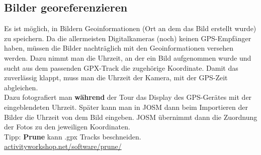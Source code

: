 \documentclass[a4paper,11pt,notumble]{leaflet}
\begin{document}
\subsection*{Bilder georeferenzieren} Es ist möglich, in Bildern Geoinformationen (Ort an dem das Bild erstellt wurde) zu 
speichern. Da die allermeisten Digitalkameras (noch) keinen GPS-Empfänger haben, müssen die Bilder nachträglich mit 
den Geoinformationen versehen werden. Dazu nimmt man die Uhrzeit, an der ein Bild aufgenommen wurde und sucht aus dem 
passenden GPX-Track die zugehörige Koordinate. Damit das zuverlässig klappt, muss man die Uhrzeit der Kamera, mit der 
GPS-Zeit abgleichen. \\
Dazu fotografiert man \textbf{während} der Tour das Display des GPS-Gerätes mit der eingeblendeten Uhrzeit. Später 
kann man in JOSM dann beim Importieren der Bilder die Uhrzeit von dem Bild eingeben. JOSM übernimmt dann die Zuordnung
der Fotos zu den jeweiligen Koordinaten. \\

Tipp: \textbf{Prune} kann .gpx Tracks beschneiden. 
\href{http://activityworkshop.net/software/prune/}{activityworkshop.net/software/prune/}

\newpage
\end{document}
